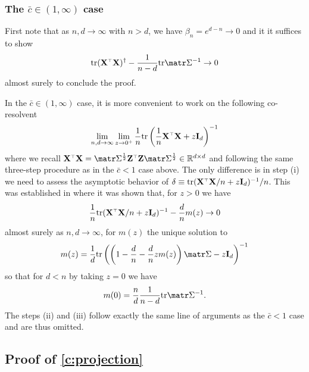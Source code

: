 \documentclass[../../thesis.tex]{subfiles}
\begin{document}
\subsubsection{The $\bar c \in (1, \infty)$ case}

First note that as $n, d \to \infty$ with $n > d$, we have $\beta_n = e^{d-n} \to 0$ and it
it suffices to show
\[
  \tr (\X^\top \X)^\dagger - \frac1{n-d} \tr \Sigmab^{-1} \to 0
\]
almost surely to conclude the proof.

In the $\bar c \in (1, \infty)$ case, it is more convenient to work on the following co-resolvent
\[
  \lim_{n,d \to \infty} \lim_{z \to 0^+} \frac1n \tr \left( \frac1n \X^\top \X + z \I_d \right)^{-1}
\]
where we recall $\X^\top \X = \Sigmab^{\frac12} \Z^\top \Z \Sigmab^{\frac12} \in \R^{d \times d}$ and following the same three-step procedure as in the $\bar c < 1$ case above. The only difference is in step (i) we need to assess the asymptotic behavior of $\delta \equiv \tr (\X^\top \X/n + z \I_d)^{-1}/n$. This was established in \cite{bai1998no} where it was shown that, for $z > 0$ we have
\[
  \frac1n \tr (\X^\top \X/n + z \I_d)^{-1} - \frac{d}n m(z) \to 0
\]
almost surely as $n,d \to \infty$, for $m(z)$ the unique solution to
\[
  m(z) = \frac1d \tr \left( \left(1- \frac{d}n - \frac{d}n z m(z) \right) \Sigmab - z \I_d \right)^{-1}
\]
so that for $d < n$ by taking $z = 0$ we have
\[
  m(0) = \frac{n}d \frac1{n-d} \tr \Sigmab^{-1}.
\]
The steps (ii) and (iii) follow exactly the same line of arguments as the $\bar c < 1$ case and are thus omitted.







\subsection{Proof of \cref{c:projection}}
\label{sec:proof-of-c-projection}
\end{document}
